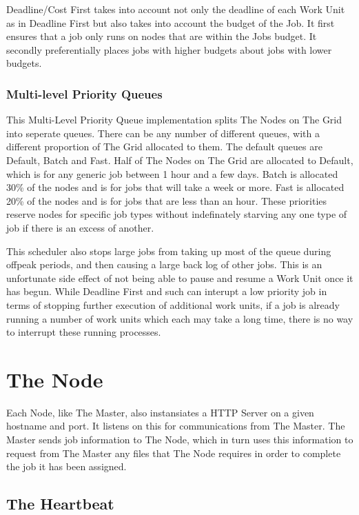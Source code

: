 Deadline\slash Cost First takes into account not only the deadline of each Work Unit as in Deadline First but also takes into account the budget of the Job. It first ensures that a job only runs on nodes that are within the Jobs budget. It secondly preferentially places jobs with higher budgets about jobs with lower budgets. 

\subsubsection{Multi-level Priority Queues}
\label{multi-levelpriorityqueues}

This Multi-Level Priority Queue implementation splits The Nodes on The Grid into seperate queues. There can be any number of different queues, with a different proportion of The Grid allocated to them. The default queues are Default, Batch and Fast. Half of The Nodes on The Grid are allocated to Default, which is for any generic job between 1 hour and a few days. Batch is allocated 30\% of the nodes and is for jobs that will take a week or more. Fast is allocated 20\% of the nodes and is for jobs that are less than an hour. These priorities reserve nodes for specific job types without indefinately starving any one type of job if there is an excess of another.

This scheduler also stops large jobs from taking up most of the queue during offpeak periods, and then causing a large back log of other jobs. This is an unfortunate side effect of not being able to pause and resume a Work Unit once it has begun. While Deadline First and such can interupt a low priority job in terms of stopping further execution of additional work units, if a job is already running a number of work units which each may take a long time, there is no way to interrupt these running processes.

\section{The Node}
\label{thenode}

Each Node, like The Master, also instansiates a HTTP Server on a given hostname and port. It listens on this for communications from The Master. The Master sends job information to The Node, which in turn uses this information to request from The Master any files that The Node requires in order to complete the job it has been assigned.

\subsection{The Heartbeat}
\label{theheartbeat}

